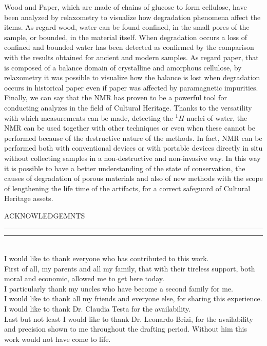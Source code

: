 \documentclass[a4paper,11pt]{report}
\begin{document}
Wood and Paper, which are made of chains of glucose to form cellulose, have been analyzed by relaxometry to visualize how degradation phenomena affect the items. As regard wood, water can be found confined, in the small pores of the sample, or bounded, in the material itself. When degradation occurs a loss of confined and bounded water has been detected as confirmed by the comparison with the results obtained for ancient and modern samples. As regard paper, that is composed of a balance domain of crystalline and amorphous cellulose, by relaxometry it was possible to visualize how the balance is lost when degradation occurs in historical paper even if paper was affected by paramagnetic impurities.\\
 Finally, we can say that the NMR has proven to be a powerful tool for conducting analyzes in the field of Cultural Heritage. Thanks to the versatility with which measurements can be made, detecting the $^1H$ nuclei of water, the NMR can be used together with other techniques or even when these cannot be performed because of the destructive nature of the methods. In fact, NMR can be performed both with conventional devices or with portable devices directly in situ without collecting samples in a non-destructive and non-invasive way. In this way it is possible to have a better understanding of the state of conservation, the causes of degradation of porous materials and also of new methods with the scope of lengthening the life time of the artifacts, for a correct safeguard of Cultural Heritage assets.




\clearpage
\printbibliography
{}

\clearpage
\thispagestyle{empty}
\begin{center}
	{{\Large{\textsc{ACKNOWLEDGEMNTS}}}} 
\rule[0.1cm]{15.8cm}{0.1mm}
\rule[0.5cm]{15.8cm}{0.6mm}
\\\vspace{3mm}
I would like to thank everyone who has contributed to this work.
\\
First of all, my parents and all my family, that with their tireless support, both moral and economic, allowed me to get here today.\\
I particularly thank my uncles who have become a second family for me.\\
I would like to thank all my friends and everyone else, for sharing this experience.\\
I would like to thank Dr. Claudia Testa for the availability.\\
Last but not least I would like to thank Dr. Leonardo Brizi, for the availability and precision shown to me throughout the drafting period. Without him this work would not have come to life.

\end{center}
\end{document}

